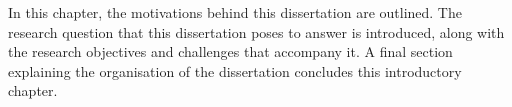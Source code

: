 In this chapter, the motivations behind this dissertation are outlined. The research question that this dissertation poses to answer is introduced, along with the research objectives and challenges that accompany it. A final section explaining the organisation of the dissertation concludes this introductory chapter.